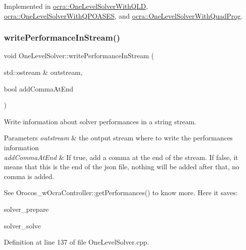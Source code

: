 Implemented in \hyperlink{classocra_1_1OneLevelSolverWithQLD_a23556b4af1bdbead4ecb242991dbd175}{ocra\+::\+One\+Level\+Solver\+With\+Q\+LD}, \hyperlink{classocra_1_1OneLevelSolverWithQPOASES_a6a0e2cdfe22731fde09af26442a9cc85}{ocra\+::\+One\+Level\+Solver\+With\+Q\+P\+O\+A\+S\+ES}, and \hyperlink{classocra_1_1OneLevelSolverWithQuadProg_a3c36b4620ee75c8f6c104244350087c2}{ocra\+::\+One\+Level\+Solver\+With\+Quad\+Prog}.

\hypertarget{classocra_1_1OneLevelSolver_a76c08041cc49d865ce2d68e6e8ae6a41}{}\label{classocra_1_1OneLevelSolver_a76c08041cc49d865ce2d68e6e8ae6a41} 
\subsubsection{\texorpdfstring{write\+Performance\+In\+Stream()}{writePerformanceInStream()}}
{\footnotesize\ttfamily void One\+Level\+Solver\+::write\+Performance\+In\+Stream (\begin{DoxyParamCaption}\item[{std\+::ostream \&}]{outstream,  }\item[{bool}]{add\+Comma\+At\+End }\end{DoxyParamCaption})}

Write information about solver performances in a string stream.


\begin{DoxyParams}{Parameters}
{\em outstream} & the output stream where to write the performances information \\
\hline
{\em add\+Comma\+At\+End} & If true, add a comma at the end of the stream. If false, it means that this is the end of the json file, nothing will be added after that, no comma is added.\\
\hline
\end{DoxyParams}
See Orocos\+\_\+w\+Ocra\+Controller\+::get\+Performances() to know more. Here it saves\+:


\begin{DoxyItemize}
\item solver\+\_\+prepare
\item solver\+\_\+solve 
\end{DoxyItemize}

Definition at line 137 of file One\+Level\+Solver.\+cpp.



